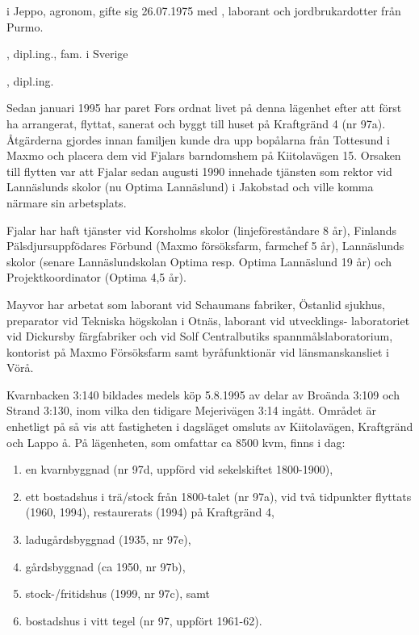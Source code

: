 


 i Jeppo, agronom, gifte sig 26.07.1975 med , laborant och jordbrukardotter från Purmo.


\begin{jhchildren}
  \item {}, dipl.ing., fam. i Sverige
  \item {}, dipl.ing.
\end{jhchildren}

Sedan januari 1995 har paret Fors ordnat livet på denna lägenhet efter att först ha arrangerat, flyttat, sanerat och byggt till huset på Kraftgränd 4 (nr 97a). Åtgärderna gjordes innan familjen kunde dra upp bopålarna från Tottesund i Maxmo och placera dem vid Fjalars barndomshem på Kiitolavägen 15. Orsaken till flytten var att Fjalar sedan augusti 1990 innehade tjänsten som rektor vid Lannäslunds skolor (nu Optima Lannäslund) i Jakobstad och ville komma närmare sin arbetsplats.

Fjalar har haft tjänster vid Korsholms skolor (linjeföreståndare 8 år), Finlands Pälsdjursuppfödares Förbund (Maxmo försöksfarm, farmchef 5 år), Lannäslunds skolor (senare Lannäslundskolan Optima resp. Optima Lannäslund 19 år) och Projektkoordinator (Optima 4,5 år).

Mayvor har arbetat som laborant vid Schaumans fabriker, Östanlid sjukhus, preparator vid Tekniska högskolan i Otnäs, laborant vid utvecklings- laboratoriet vid Dickursby färgfabriker och vid Solf Centralbutiks spannmålslaboratorium, kontorist på Maxmo Försöksfarm samt byråfunktionär vid länsmanskansliet i Vörå.

Kvarnbacken 3:140 bildades medels köp 5.8.1995 av delar av Broända 3:109 och Strand 3:130, inom vilka den tidigare Mejerivägen 3:14 ingått. Området är enhetligt på så vis att fastigheten i dagsläget omsluts av Kiitolavägen, Kraftgränd och Lappo å. På lägenheten, som omfattar ca 8500 kvm, finns i dag:
\begin{enumerate}
  \item en kvarnbyggnad (nr 97d, uppförd vid sekelskiftet 1800-1900),
  \item ett bostadshus i trä/stock från 1800-talet (nr 97a), vid två tidpunkter flyttats (1960, 1994), restaurerats (1994) på Kraftgränd 4,
  \item ladugårdsbyggnad (1935, nr 97e),
  \item gårdsbyggnad (ca 1950, nr 97b),
  \item stock-/fritidshus (1999, nr 97c), samt
  \item bostadshus i vitt tegel (nr 97, uppfört 1961-62).
\end{enumerate}

